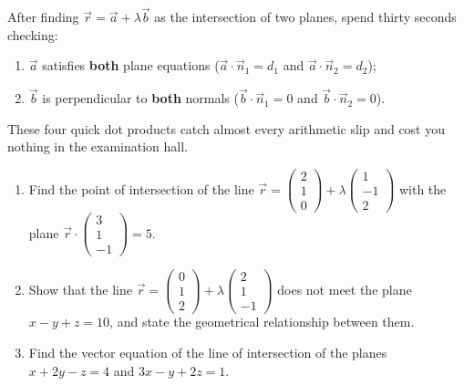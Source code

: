 \documentclass[11pt]{article}
\begin{document}
\begin{methode}
After finding $\vec{r}=\vec{a}+\lambda\vec{b}$ as the intersection of two planes, spend thirty seconds checking:
\begin{enumerate}
\item $\vec{a}$ satisfies \textbf{both} plane equations ($\vec{a}\cdot\vec{n}_1=d_1$ and $\vec{a}\cdot\vec{n}_2=d_2$);
\item $\vec{b}$ is perpendicular to \textbf{both} normals ($\vec{b}\cdot\vec{n}_1=0$ and $\vec{b}\cdot\vec{n}_2=0$).
\end{enumerate}
These four quick dot products catch almost every arithmetic slip and cost you nothing in the examination hall.
\end{methode}

\begin{exercice}[Practice]
\begin{enumerate}
\item Find the point of intersection of the line $\vec{r}=\begin{pmatrix}2\\1\\0\end{pmatrix}+\lambda\begin{pmatrix}1\\-1\\2\end{pmatrix}$ with the plane $\vec{r}\cdot\begin{pmatrix}3\\1\\-1\end{pmatrix}=5$.
\item Show that the line $\vec{r}=\begin{pmatrix}0\\1\\2\end{pmatrix}+\lambda\begin{pmatrix}2\\1\\-1\end{pmatrix}$ does not meet the plane $x-y+z=10$, and state the geometrical relationship between them.
\item Find the vector equation of the line of intersection of the planes $x+2y-z=4$ and $3x-y+2z=1$.
\end{enumerate}
\end{exercice}
\end{document}
